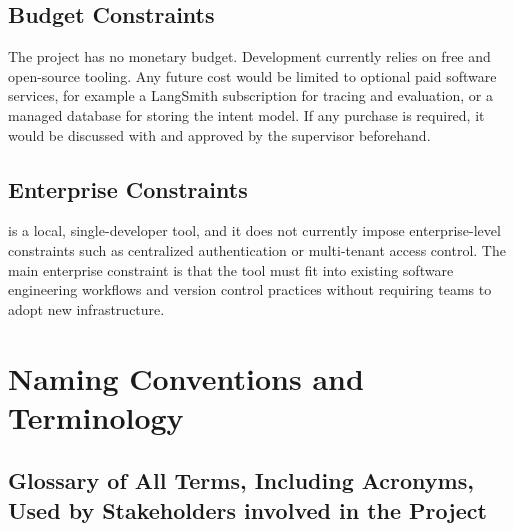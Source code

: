 \documentclass[12pt]{article}
\begin{document}
\subsection{Budget Constraints}

The project has no monetary budget. Development currently relies on free and
open-source tooling. 
Any future cost would be limited to optional paid software services, for example a LangSmith subscription
for tracing and evaluation, or a managed
database for storing the intent model. If any purchase is required, it would be discussed with and approved by the
supervisor beforehand.

\subsection{Enterprise Constraints}

\progname{} is a local, single-developer tool, and it does not currently impose
enterprise-level constraints such as centralized authentication or multi-tenant
access control. The main enterprise constraint is that the tool must fit into
existing software engineering workflows and version control practices without
requiring teams to adopt new infrastructure. 

\section{Naming Conventions and Terminology}
\subsection{Glossary of All Terms, Including Acronyms, Used by Stakeholders
involved in the Project}
\end{document}
